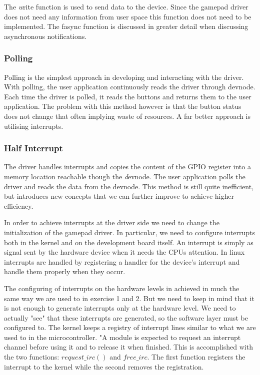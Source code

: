 The \emph write function is used to send data to the device. Since the gamepad driver does not need any information from user space this function does not need to be implemented. The fasync function is discussed in greater detail when discussing asynchronous notifications. 




\subsubsection{Polling}
Polling is the simplest approach in developing and interacting with the driver. With polling, the user application continuously reads the driver through devnode. Each time the driver is polled, it reads the buttons and returns them to the user application. The problem with this method however is that the button status does not change that often implying waste of resources. A far better approach is utilising interrupts. 


\subsubsection{Half Interrupt}
The driver handles interrupts and copies the content of the GPIO register into a memory location reachable though the {\emph devnode}. The user application polls the driver and reads the data from the devnode. This method is still quite inefficient, but introduces new concepts that we can further improve to achieve higher efficiency. 

In order to achieve interrupts at the driver side we need to change the initialization of the gamepad driver. In particular, we need to configure interrupts both in the kernel and on the development board itself. An interrupt is simply as signal sent by the hardware device when it needs the CPUs attention. In linux interrupts are handled by registering a handler for the device's interrupt and handle them properly when they occur. 

The configuring of interrupts on the hardware levels in achieved in much the same way we are used to 
in exercise 1 and 2. But we need to keep in mind that it is not enough to generate interrupts only at the hardware level. We need to actually "see" that these interrupts are generated, so the software layer must be configured to. The kernel keeps a registry of interrupt lines similar to what we are used to in the microcontroller. "A module is expected to request an interrupt channel before using it and to release it when finished. This is accomplished with the two functions: $request\_irc()$ and $free\_irc$. The first function registers the interrupt to the kernel while the second removes the registration. 

